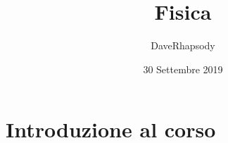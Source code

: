 \documentclass[12pt, a4paper, openany, twoside]{book}
\begin{document}
\pagestyle{plain}
\author{DaveRhapsody}
\title{Fisica}
\date{30 Settembre 2019}
\maketitle
\tableofcontents
\chapter{Introduzione al corso}
\end{document}
